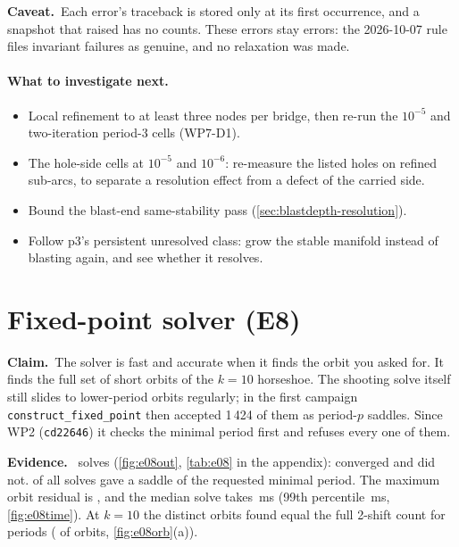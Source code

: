 \documentclass[11pt,a4paper]{article}
\newcommand{\claim}{\par\smallskip\noindent\textbf{Claim.}~}
\newcommand{\evidence}{\par\smallskip\noindent\textbf{Evidence.}~}
\newcommand{\caveat}{\par\smallskip\noindent\textbf{Caveat.}~}
\newcommand{\code}[1]{\texttt{#1}}
\begin{document}
\caveat Each error's traceback is stored only at its first occurrence, and
a snapshot that raised has no counts. These errors stay errors: the
2026-10-07 rule files invariant failures as genuine, and no relaxation was
made.

\paragraph{What to investigate next.}
\begin{itemize}[leftmargin=*]
\item Local refinement to at least three nodes per bridge, then re-run the
  $10^{-5}$ and two-iteration period-3 cells (WP7-D1).
\item The hole-side cells at $10^{-5}$ and $10^{-6}$: re-measure the listed
  holes on refined sub-arcs, to separate a resolution effect from a defect
  of the carried side.
\item Bound the blast-end same-stability pass (\cref{sec:blastdepth-resolution}).
\item Follow p3's persistent unresolved class: grow the stable manifold
  instead of blasting again, and see whether it resolves.
\end{itemize}

\section{Fixed-point solver (E8)}
\label{sec:solver}

\claim The solver is fast and accurate when it finds the orbit you asked
for. It finds the full set of short orbits of the $k=10$ horseshoe. The
shooting solve itself still slides to lower-period orbits regularly; in the
first campaign \code{construct\_fixed\_point} then accepted 1\,424 of them
as period-$p$ saddles. Since WP2 (\code{cd22646}) it checks the minimal
period first and refuses every one of them.

\evidence \NumSolverSolves{} solves (\cref{fig:e08out}, \cref{tab:e08} in
the appendix): \NumSolverConvergedRate{} converged and
\NumSolverNoConvergenceRate{} did not. \NumSolverSaddleRate{} of all solves
gave a saddle of the requested minimal period. The maximum orbit residual is
\NumSolverMaxResidual{}, and the median solve takes \NumSolverMedianMs\,ms
(99th percentile \NumSolverPNinetyNineMs\,ms, \cref{fig:e08time}). At $k=10$
the distinct orbits found equal the full 2-shift count for
\NumHorseshoeMatched{} periods (\NumHorseshoeFound{} of
\NumHorseshoeExpected{} orbits, \cref{fig:e08orb}(a)).
\end{document}
